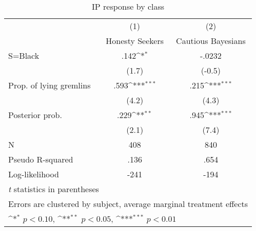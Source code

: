 \begin{table}[htbp]\centering
\def\sym#1{\ifmmode^{#1}\else\(^{#1}\)\fi}
\caption{IP response by class}
\begin{tabular}{l*{2}{c}}
\hline\hline
                &\multicolumn{1}{c}{(1)}&\multicolumn{1}{c}{(2)}\\
                &\multicolumn{1}{c}{Honesty Seekers}&\multicolumn{1}{c}{Cautious Bayesians}\\
\hline
S=Black         &     .142\sym{*}  &   -.0232         \\
                &    (1.7)         &   (-0.5)         \\
Prop. of lying gremlins&     .593\sym{***}&     .215\sym{***}\\
                &    (4.2)         &    (4.3)         \\
Posterior prob. &     .229\sym{**} &     .945\sym{***}\\
                &    (2.1)         &    (7.4)         \\
\hline
N               &      408         &      840         \\
Pseudo R-squared&     .136         &     .654         \\
Log-likelihood  &     -241         &     -194         \\
\hline\hline
\multicolumn{3}{l}{\footnotesize \textit{t} statistics in parentheses}\\
\multicolumn{3}{l}{\footnotesize Errors are clustered by subject, average marginal treatment effects}\\
\multicolumn{3}{l}{\footnotesize \sym{*} \(p<0.10\), \sym{**} \(p<0.05\), \sym{***} \(p<0.01\)}\\
\end{tabular}
\end{table}
